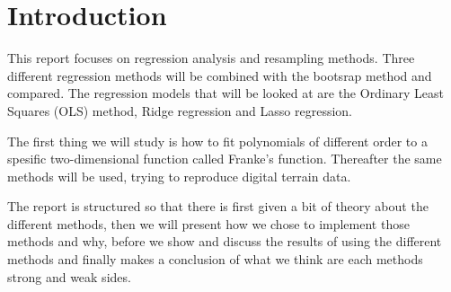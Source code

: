 \section{Introduction}
This report focuses on regression analysis and resampling methods. 
Three different regression methods will be combined with the bootsrap method 
and compared.
The regression models that will be looked at are the Ordinary Least Squares
(OLS) method, Ridge regression and Lasso regression. 

The first thing we will study is how to fit polynomials of different order
to a spesific two-dimensional function called Franke's function. 
Thereafter the same methods will be used, trying to reproduce digital terrain
data.

The report is structured so that there is first given a bit of theory 
about the different methods, then we will present how we chose to implement 
those methods and why, before we show and discuss the results of using the 
different methods and finally makes a conclusion of what we think are 
each methods strong and weak sides. 
